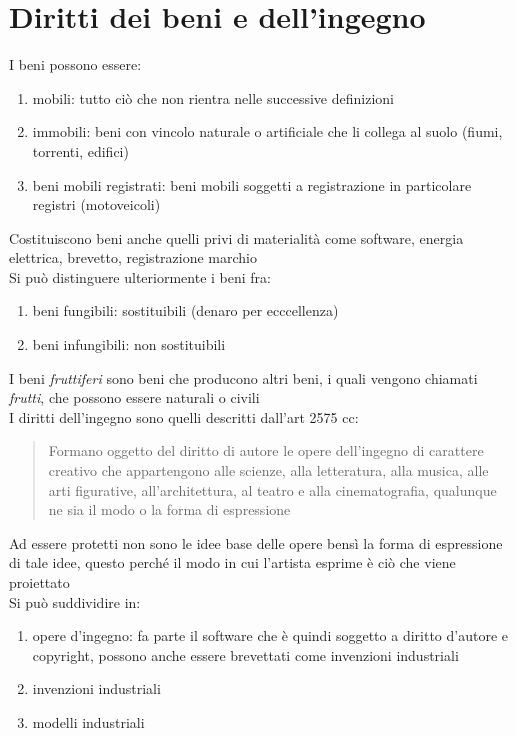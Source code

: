 \documentclass[10pt,oneside,a4paper]{article}
\begin{document}
	\section{Diritti dei beni e dell'ingegno}
	I beni possono essere:
	\begin{enumerate}
		\item mobili: tutto ciò che non rientra nelle successive definizioni
		\item immobili: beni con vincolo naturale o artificiale che li collega al suolo (fiumi, torrenti, edifici)
		\item beni mobili registrati: beni mobili soggetti a registrazione in particolare registri (motoveicoli)
	\end{enumerate}
	Costituiscono beni anche quelli privi di materialità come software, energia elettrica, brevetto, registrazione marchio\\
	Si può distinguere ulteriormente i beni fra:
	\begin{enumerate}
		\item beni fungibili: sostituibili (denaro per ecccellenza)
		\item beni infungibili: non sostituibili
	\end{enumerate}
	I beni \textit{fruttiferi} sono beni che producono altri beni, i quali vengono chiamati \textit{frutti}, che possono essere naturali o civili\\
	I diritti dell'ingegno sono quelli descritti dall'art 2575 cc:\\
	\begin{quote}
	Formano oggetto del diritto di autore le opere dell'ingegno di carattere creativo che appartengono alle scienze, alla letteratura, alla musica, alle 
	arti figurative, all'architettura, al teatro e alla cinematografia, qualunque ne sia il modo o la forma di espressione\\
	\end{quote}
	Ad essere protetti non sono le idee base delle opere bensì la forma di espressione di tale idee, questo perché il modo in cui l'artista esprime è ciò che viene proiettato\\
	Si può suddividire in:
	\begin{enumerate}
		\item opere d'ingegno: fa parte il software che è quindi soggetto a diritto d'autore e copyright, possono anche essere brevettati come invenzioni industriali 
		\item invenzioni industriali
		\item modelli industriali
	\end{enumerate}
\end{document}

